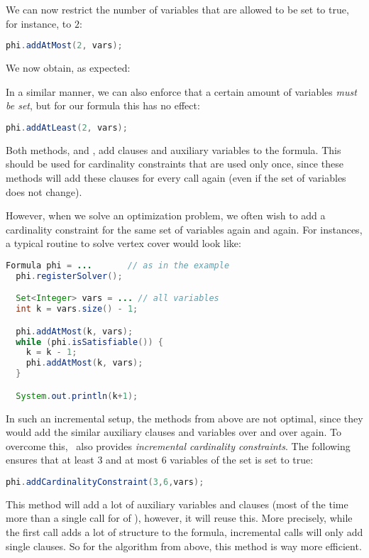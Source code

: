 \documentclass[a4paper, ukenglish, twoside, openright]{jdrasilmanual}
\begin{document}

We can now restrict the number of variables that are allowed to be set
to true, for instance, to $2$:
\begin{lstlisting}[language=Java]
  phi.addAtMost(2, vars);
\end{lstlisting}
We now obtain, as expected:


In a similar manner, we can also enforce that a certain amount of
variables \emph{must be set}, but for our formula this has no effect:
\begin{lstlisting}[language=Java]
  phi.addAtLeast(2, vars);
\end{lstlisting}
Both methods, 
 and , add
clauses and auxiliary variables to the formula. This should be used
for cardinality constraints that are used only once, since these
methods will add these clauses for every call again (even if the set
of variables does not change).

However, when we solve an optimization problem, we often wish to add a
cardinality constraint for the same set of variables again and
again. For instances, a typical routine to solve vertex cover would
look like:
\begin{lstlisting}[language=Java]
  Formula phi = ...       // as in the example
  phi.registerSolver();

  Set<Integer> vars = ... // all variables
  int k = vars.size() - 1;

  phi.addAtMost(k, vars);
  while (phi.isSatisfiable()) {
    k = k - 1;
    phi.addAtMost(k, vars);
  }

  System.out.println(k+1);
\end{lstlisting}
In such an incremental setup, the methods from above are not optimal,
since they would add the similar auxiliary clauses and variables over
and over again. To overcome this, \Jdrasil\ also provides
\emph{incremental cardinality constraints}. The following ensures that
at least $3$ and at most $6$ variables of the set  is
set to true:
\begin{lstlisting}[language=Java]
  phi.addCardinalityConstraint(3,6,vars);
\end{lstlisting}
This 
method will add a lot of auxiliary variables and clauses (most of
the time more than a single call for of ), however,
it will reuse this. More precisely, while the first call adds a lot of
structure to the formula, incremental calls will only add single
clauses. So for the algorithm from above, this method is way more
efficient. 
\end{document}
